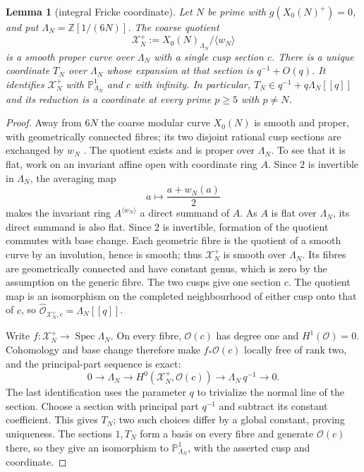 \documentclass[11pt,a4paper]{article}
\numberwithin{equation}{section}
\newtheorem{lemma}[theorem]{Lemma}
\theoremstyle{definition}
\theoremstyle{remark}
\newcommand{\Z}{\mathbb Z}
\begin{document}
\begin{lemma}[integral Fricke coordinate]\label{lem:coordinate}
Let $N$ be prime with $g(X_0(N)^+)=0$, and put
$\Lambda_N=\Z[1/(6N)]$. The coarse quotient
\[
\mathcal X_N^+:=X_0(N)_{\Lambda_N}/\langle w_N\rangle
\]
is a smooth proper curve over $\Lambda_N$ with a single cusp section $c$.
There is a unique coordinate $T_N$ over $\Lambda_N$ whose expansion at
that section is $q^{-1}+O(q)$. It identifies $\mathcal X_N^+$ with
$\mathbb P^1_{\Lambda_N}$ and $c$ with infinity. In particular,
$T_N\in q^{-1}+q\Lambda_N[[q]]$ and its reduction is a coordinate
at every prime $p\ge5$ with $p\ne N$.
\end{lemma}
\begin{proof}
Away from $6N$ the coarse modular curve $X_0(N)$ is smooth and proper,
with geometrically connected fibres; its two disjoint rational cusp
sections are exchanged by $w_N$ \citep{DR73,KM85}.
The quotient exists and is proper over $\Lambda_N$. To see that it is flat,
work on an invariant affine open with coordinate ring $A$. Since $2$ is
invertible in $\Lambda_N$, the averaging map
\[
a\longmapsto \frac{a+w_N(a)}{2}
\]
makes the invariant ring $A^{\langle w_N\rangle}$ a direct summand of $A$.
As $A$ is flat over $\Lambda_N$, its direct summand is also flat. Since $2$ is invertible,
formation of the quotient commutes with base change. Each geometric
fibre is the quotient of a smooth curve by an involution, hence is
smooth; thus $\mathcal X_N^+$ is smooth over $\Lambda_N$.
Its fibres are geometrically connected and have constant genus,
which is zero by the assumption on the generic fibre.
The two cusps give one section $c$. The quotient map is an isomorphism
on the completed neighbourhood of either cusp onto that of $c$, so
$\widehat{\mathcal O}_{\mathcal X_N^+,c}=\Lambda_N[[q]]$.

Write $f:\mathcal X_N^+\to\operatorname{Spec}\Lambda_N$.
On every fibre, $\mathcal O(c)$ has degree one and $H^1(\mathcal O)=0$.
Cohomology and base change therefore make $f_*\mathcal O(c)$ locally
free of rank two, and the principal-part sequence is exact:
\[
0\longrightarrow\Lambda_N\longrightarrow
H^0(\mathcal X_N^+,\mathcal O(c))
\longrightarrow\Lambda_N\,q^{-1}\longrightarrow0.
\]
The last identification uses the parameter $q$ to trivialize the
normal line of the section. Choose a section with principal part
$q^{-1}$ and subtract its constant coefficient. This gives $T_N$;
two such choices differ by a global constant, proving uniqueness.
The sections $1,T_N$ form a basis on every fibre and generate
$\mathcal O(c)$ there, so they give an isomorphism to
$\mathbb P^1_{\Lambda_N}$, with the asserted cusp and coordinate.
\end{proof}
\end{document}
